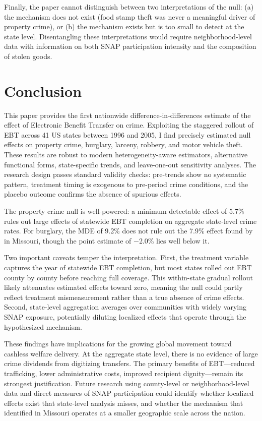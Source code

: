 \documentclass[12pt]{article}
\begin{document}
Finally, the paper cannot distinguish between two interpretations of the null: (a) the mechanism does not exist (food stamp theft was never a meaningful driver of property crime), or (b) the mechanism exists but is too small to detect at the state level. Disentangling these interpretations would require neighborhood-level data with information on both SNAP participation intensity and the composition of stolen goods.


\section{Conclusion} \label{sec:conclusion}

This paper provides the first nationwide difference-in-differences estimate of the effect of Electronic Benefit Transfer on crime. Exploiting the staggered rollout of EBT across 41 US states between 1996 and 2005, I find precisely estimated null effects on property crime, burglary, larceny, robbery, and motor vehicle theft. These results are robust to modern heterogeneity-aware estimators, alternative functional forms, state-specific trends, and leave-one-out sensitivity analyses. The research design passes standard validity checks: pre-trends show no systematic pattern, treatment timing is exogenous to pre-period crime conditions, and the placebo outcome confirms the absence of spurious effects.

The property crime null is well-powered: a minimum detectable effect of 5.7\% rules out large effects of statewide EBT completion on aggregate state-level crime rates. For burglary, the MDE of 9.2\% does not rule out the 7.9\% effect found by \citet{wright2017less} in Missouri, though the point estimate of $-$2.0\% lies well below it.

Two important caveats temper the interpretation. First, the treatment variable captures the year of statewide EBT completion, but most states rolled out EBT county by county before reaching full coverage. This within-state gradual rollout likely attenuates estimated effects toward zero, meaning the null could partly reflect treatment mismeasurement rather than a true absence of crime effects. Second, state-level aggregation averages over communities with widely varying SNAP exposure, potentially diluting localized effects that operate through the hypothesized mechanism.

These findings have implications for the growing global movement toward cashless welfare delivery. At the aggregate state level, there is no evidence of large crime dividends from digitizing transfers. The primary benefits of EBT---reduced trafficking, lower administrative costs, improved recipient dignity---remain its strongest justification. Future research using county-level or neighborhood-level data and direct measures of SNAP participation could identify whether localized effects exist that state-level analysis misses, and whether the mechanism that \citet{wright2017less} identified in Missouri operates at a smaller geographic scale across the nation.
\end{document}
